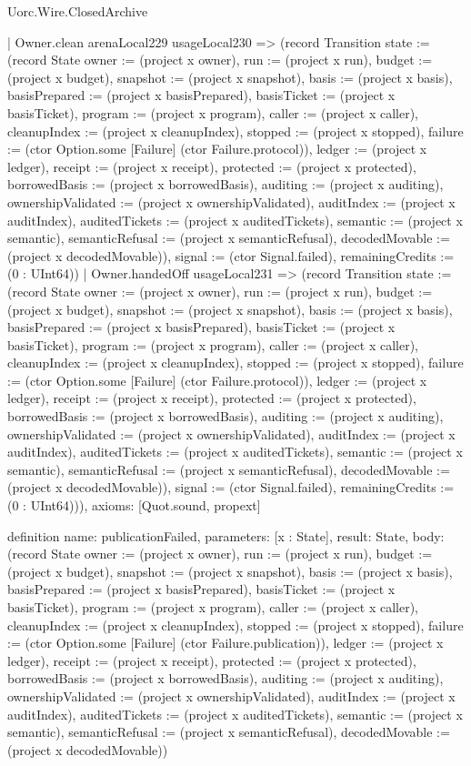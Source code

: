 \begin{lexlean}{Uorc.Wire.ClosedArchive}
\begin{semanticmodule}
{    | Owner.clean arenaLocal229 usageLocal230 => (record Transition {state := (record State {owner := (project x owner), run := (project x run), budget := (project x budget), snapshot := (project x snapshot), basis := (project x basis), basisPrepared := (project x basisPrepared), basisTicket := (project x basisTicket), program := (project x program), caller := (project x caller), cleanupIndex := (project x cleanupIndex), stopped := (project x stopped), failure := (ctor Option.some [Failure] (ctor Failure.protocol)), ledger := (project x ledger), receipt := (project x receipt), protected := (project x protected), borrowedBasis := (project x borrowedBasis), auditing := (project x auditing), ownershipValidated := (project x ownershipValidated), auditIndex := (project x auditIndex), auditedTickets := (project x auditedTickets), semantic := (project x semantic), semanticRefusal := (project x semanticRefusal), decodedMovable := (project x decodedMovable)}), signal := (ctor Signal.failed), remainingCredits := (0 : UInt64)})
    | Owner.handedOff usageLocal231 => (record Transition {state := (record State {owner := (project x owner), run := (project x run), budget := (project x budget), snapshot := (project x snapshot), basis := (project x basis), basisPrepared := (project x basisPrepared), basisTicket := (project x basisTicket), program := (project x program), caller := (project x caller), cleanupIndex := (project x cleanupIndex), stopped := (project x stopped), failure := (ctor Option.some [Failure] (ctor Failure.protocol)), ledger := (project x ledger), receipt := (project x receipt), protected := (project x protected), borrowedBasis := (project x borrowedBasis), auditing := (project x auditing), ownershipValidated := (project x ownershipValidated), auditIndex := (project x auditIndex), auditedTickets := (project x auditedTickets), semantic := (project x semantic), semanticRefusal := (project x semanticRefusal), decodedMovable := (project x decodedMovable)}), signal := (ctor Signal.failed), remainingCredits := (0 : UInt64)})),
  axioms: [Quot.sound, propext]
}

definition{
  name: publicationFailed,
  parameters: [x : State],
  result: State,
  body: (record State {owner := (project x owner), run := (project x run), budget := (project x budget), snapshot := (project x snapshot), basis := (project x basis), basisPrepared := (project x basisPrepared), basisTicket := (project x basisTicket), program := (project x program), caller := (project x caller), cleanupIndex := (project x cleanupIndex), stopped := (project x stopped), failure := (ctor Option.some [Failure] (ctor Failure.publication)), ledger := (project x ledger), receipt := (project x receipt), protected := (project x protected), borrowedBasis := (project x borrowedBasis), auditing := (project x auditing), ownershipValidated := (project x ownershipValidated), auditIndex := (project x auditIndex), auditedTickets := (project x auditedTickets), semantic := (project x semantic), semanticRefusal := (project x semanticRefusal), decodedMovable := (project x decodedMovable)})
}


\end{semanticmodule}
\end{lexlean}
